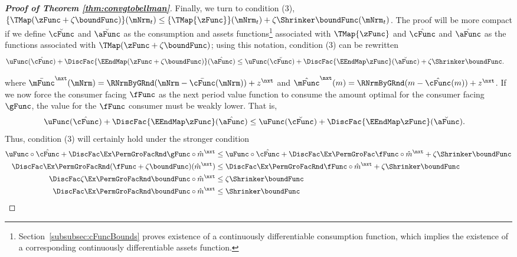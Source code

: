 \documentclass[\econtexRoot/BufferStockTheory]{subfiles}
\begin{document}
\begin{proof}[\textbf{Proof of Theorem \ref{thm:convgtobellman}}]
Finally, we turn to condition (3), $\{\TMap({\zFunc} +\zeta\boundFunc
)\}(\mNrm_{t}) \leq \{\TMap{\zFunc}\}(\mNrm_{t}) +\zeta \Shrinker
\boundFunc(\mNrm_{t})$.
The proof will be more compact if we define
$\breve{\cFunc}$ and $\breve{\aFunc}$ as the consumption and assets
functions\footnote{Section~\ref{subsubsec:cFuncBounds} proves existence of a
  continuously differentiable consumption function, which implies the
  existence of a corresponding continuously differentiable assets
  function.}  associated with $\TMap{\zFunc}$ and $\hat{\cFunc}$ and
$\hat{\aFunc}$ as the functions associated with $\TMap({\zFunc+\zeta
  \boundFunc})$; using this notation, condition (3) can be rewritten
\begin{align*}
  \uFunc(\hat{\cFunc})+\DiscFac \{\EEndMap (\zFunc+\zeta \boundFunc) \}(\hat{\aFunc})  & \leq  \uFunc(\breve{\cFunc})+\DiscFac \{\EEndMap \zFunc \}(\breve{\aFunc})  + \zeta \Shrinker \boundFunc.
\end{align*}

where $\bar{\mFunc}^{\nxt}(\mNrm) = \RNrmByGRnd(\mNrm - \bar{\cFunc}(\mNrm)) + z^{\nxt}$ and $\hat{\mFunc}^{\nxt}(m) = \RNrmByGRnd(m - \hat{\cFunc}(m)) + z^{\nxt}$.
If we now force the consumer facing $\fFunc$ as the next period value function to consume the amount optimal for the consumer facing $\gFunc$, the value for the $\fFunc$ consumer must be weakly lower.
That is,
%
%
%
\begin{align*}
  \uFunc(\hat{\cFunc})+\DiscFac \{\EEndMap \zFunc \}(\hat{\aFunc})  & \leq \uFunc(\breve{\cFunc})+\DiscFac \{\EEndMap \zFunc \}(\breve{\aFunc})
                                                                      .
\end{align*}
Thus, condition (3) will certainly hold under the stronger condition
\begin{align*}
  \uFunc\circ \hat{\cFunc} +\DiscFac \Ex\PermGroFacRnd \gFunc \circ \hat{m}^{\nxt}  & \leq  \uFunc\circ \hat{\cFunc} + \DiscFac \Ex \PermGroFac \fFunc\circ\hat{m}^{\nxt}  + \zeta \Shrinker \boundFunc
  \\ \DiscFac\Ex\PermGroFacRnd (\fFunc +\zeta \boundFunc)(\hat{m}^{\nxt})  & \leq  \DiscFac \Ex\PermGroFacRnd \fFunc\circ \hat{m}^{\nxt}  + \zeta \Shrinker \boundFunc
  \\ \DiscFac\zeta \Ex\PermGroFacRnd  \boundFunc\circ\hat{m}^{\nxt}  & \leq  \zeta \Shrinker \boundFunc
  \\ \DiscFac \Ex\PermGroFacRnd \boundFunc \circ \hat{m}^{\nxt}  & \leq  \Shrinker \boundFunc
\end{align*}%


\end{proof}
\end{document}
